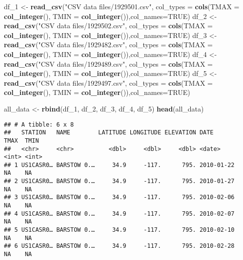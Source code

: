 \documentclass[]{article}
\newenvironment{Shaded}{\begin{snugshade}}{\end{snugshade}}
\newcommand{\DataTypeTok}[1]{\textcolor[rgb]{0.13,0.29,0.53}{#1}}
\newcommand{\DecValTok}[1]{\textcolor[rgb]{0.00,0.00,0.81}{#1}}
\newcommand{\KeywordTok}[1]{\textcolor[rgb]{0.13,0.29,0.53}{\textbf{#1}}}
\newcommand{\NormalTok}[1]{#1}
\newcommand{\OtherTok}[1]{\textcolor[rgb]{0.56,0.35,0.01}{#1}}
\newcommand{\StringTok}[1]{\textcolor[rgb]{0.31,0.60,0.02}{#1}}
\begin{document}
\begin{Shaded}
\begin{Highlighting}[]
\NormalTok{df_}\DecValTok{1}\NormalTok{ <-}\StringTok{ }\KeywordTok{read_csv}\NormalTok{(}\StringTok{"CSV data files/1929501.csv"}\NormalTok{, }\DataTypeTok{col_types =} \KeywordTok{cols}\NormalTok{(}\DataTypeTok{TMAX =} \KeywordTok{col_integer}\NormalTok{(), }\DataTypeTok{TMIN =} \KeywordTok{col_integer}\NormalTok{()),}\DataTypeTok{col_names=}\OtherTok{TRUE}\NormalTok{)}
\NormalTok{df_}\DecValTok{2}\NormalTok{ <-}\StringTok{ }\KeywordTok{read_csv}\NormalTok{(}\StringTok{"CSV data files/1929502.csv"}\NormalTok{, }\DataTypeTok{col_types =} \KeywordTok{cols}\NormalTok{(}\DataTypeTok{TMAX =} \KeywordTok{col_integer}\NormalTok{(), }\DataTypeTok{TMIN =} \KeywordTok{col_integer}\NormalTok{()),}\DataTypeTok{col_names=}\OtherTok{TRUE}\NormalTok{)}
\NormalTok{df_}\DecValTok{3}\NormalTok{ <-}\StringTok{ }\KeywordTok{read_csv}\NormalTok{(}\StringTok{"CSV data files/1929482.csv"}\NormalTok{, }\DataTypeTok{col_types =} \KeywordTok{cols}\NormalTok{(}\DataTypeTok{TMAX =} \KeywordTok{col_integer}\NormalTok{(), }\DataTypeTok{TMIN =} \KeywordTok{col_integer}\NormalTok{()),}\DataTypeTok{col_names=}\OtherTok{TRUE}\NormalTok{)}
\NormalTok{df_}\DecValTok{4}\NormalTok{ <-}\StringTok{ }\KeywordTok{read_csv}\NormalTok{(}\StringTok{"CSV data files/1929489.csv"}\NormalTok{, }\DataTypeTok{col_types =} \KeywordTok{cols}\NormalTok{(}\DataTypeTok{TMAX =} \KeywordTok{col_integer}\NormalTok{(), }\DataTypeTok{TMIN =} \KeywordTok{col_integer}\NormalTok{()),}\DataTypeTok{col_names=}\OtherTok{TRUE}\NormalTok{)}
\NormalTok{df_}\DecValTok{5}\NormalTok{ <-}\StringTok{ }\KeywordTok{read_csv}\NormalTok{(}\StringTok{"CSV data files/1929497.csv"}\NormalTok{, }\DataTypeTok{col_types =} \KeywordTok{cols}\NormalTok{(}\DataTypeTok{TMAX =} \KeywordTok{col_integer}\NormalTok{(), }\DataTypeTok{TMIN =} \KeywordTok{col_integer}\NormalTok{()),}\DataTypeTok{col_names=}\OtherTok{TRUE}\NormalTok{)}

\NormalTok{all_data <-}\StringTok{ }\KeywordTok{rbind}\NormalTok{(df_}\DecValTok{1}\NormalTok{, df_}\DecValTok{2}\NormalTok{, df_}\DecValTok{3}\NormalTok{, df_}\DecValTok{4}\NormalTok{, df_}\DecValTok{5}\NormalTok{)}
\KeywordTok{head}\NormalTok{(all_data)}
\end{Highlighting}
\end{Shaded}

\begin{verbatim}
## # A tibble: 6 x 8
##   STATION   NAME        LATITUDE LONGITUDE ELEVATION DATE        TMAX  TMIN
##   <chr>     <chr>          <dbl>     <dbl>     <dbl> <date>     <int> <int>
## 1 US1CASR0… BARSTOW 0.…     34.9     -117.      795. 2010-01-22    NA    NA
## 2 US1CASR0… BARSTOW 0.…     34.9     -117.      795. 2010-01-27    NA    NA
## 3 US1CASR0… BARSTOW 0.…     34.9     -117.      795. 2010-02-06    NA    NA
## 4 US1CASR0… BARSTOW 0.…     34.9     -117.      795. 2010-02-07    NA    NA
## 5 US1CASR0… BARSTOW 0.…     34.9     -117.      795. 2010-02-10    NA    NA
## 6 US1CASR0… BARSTOW 0.…     34.9     -117.      795. 2010-02-28    NA    NA
\end{verbatim}
\end{document}
